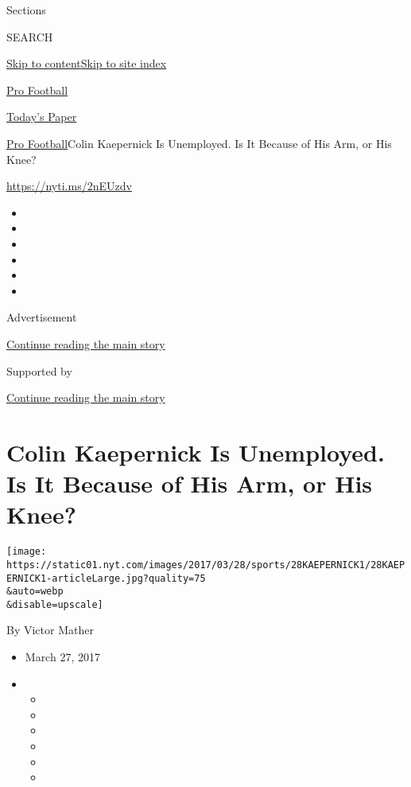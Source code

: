 Sections

SEARCH

\protect\hyperlink{site-content}{Skip to
content}\protect\hyperlink{site-index}{Skip to site index}

\href{https://www.nytimes.com/section/sports/football}{Pro Football}

\href{https://myaccount.nytimes.com/auth/login?response_type=cookie\&client_id=vi}{}

\href{https://www.nytimes.com/section/todayspaper}{Today's Paper}

\href{/section/sports/football}{Pro Football}\textbar{}Colin Kaepernick
Is Unemployed. Is It Because of His Arm, or His Knee?

\url{https://nyti.ms/2nEUzdv}

\begin{itemize}
\item
\item
\item
\item
\item
\item
\end{itemize}

Advertisement

\protect\hyperlink{after-top}{Continue reading the main story}

Supported by

\protect\hyperlink{after-sponsor}{Continue reading the main story}

\hypertarget{colin-kaepernick-is-unemployed-is-it-because-of-his-arm-or-his-knee}{%
\section{Colin Kaepernick Is Unemployed. Is It Because of His Arm, or
His
Knee?}\label{colin-kaepernick-is-unemployed-is-it-because-of-his-arm-or-his-knee}}

\texttt{[image: https://static01.nyt.com/images/2017/03/28/sports/28KAEPERNICK1/28KAEPERNICK1-articleLarge.jpg?quality=75\\\&auto=webp\\\&disable=upscale]}

By Victor Mather

\begin{itemize}
\item
  March 27, 2017
\item
  \begin{itemize}
  \item
  \item
  \item
  \item
  \item
  \item
  \end{itemize}
\end{itemize}

